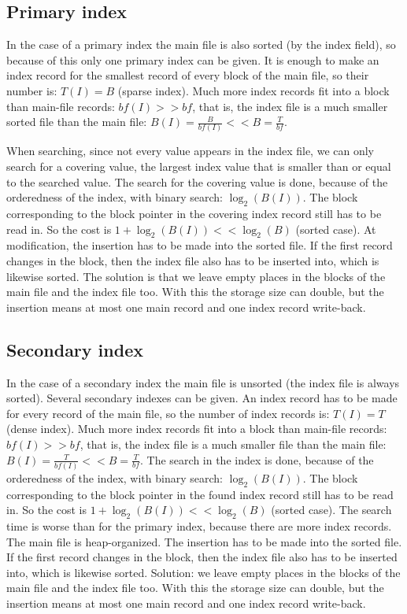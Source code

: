 \documentclass[margin=0px]{article}
\begin{document}
\subsection{Primary index}

In the case of a primary index the main file is also sorted (by the index field), so because of this only one primary
index can be given. It is enough to make an index record for the smallest record of every block of the main file,
so their number is: $T(I)  = B$ (sparse index). Much more index records fit into a block than
main-file records: $bf(I)  >> bf$, that is, the index file is a much smaller sorted file than the main file:
$B(I) = \frac{B}{bf(I)} << B = \frac{T}{bf}$.

When searching, since not every value appears in the index file, we can only search for a covering value, the
largest index value that is smaller than or equal to the searched value. The search for the covering value is done,
because of the orderedness of the index, with binary search: $\log_{2}(B(I))$. The block corresponding to the block pointer in
the covering index record still has to be read in. So the cost is $1+\log_{2}(B(I)) << \log_{2}(B)$ (sorted
case).
At modification, the insertion has to be made into the sorted file. If the first record changes in the block, then the
index file also has to be inserted into, which is likewise sorted. The solution is that we leave empty places in the
blocks of the main file and the index file too. With this the storage size can double, but the insertion means at most one
main record and one index record write-back.

\subsection{Secondary index}

In the case of a secondary index the main file is unsorted (the index file is always sorted). Several secondary indexes
can be given. An index record has to be made for every record of the main file, so the number of
index records is: $T(I) = T$ (dense index). Much more index records fit into a block than main-file
records: $bf(I) >> bf$, that is, the index file is a much smaller file than the main file: $B(I) = \frac{T}{bf(I)} <<
    B=\frac{T}{bf}$.
The search in the index is done, because of the orderedness of the index, with binary search: $\log_{2}(B(I))$. The block
corresponding to the block pointer in the found index record still has to be read in. So the cost is
$1+\log_{2}(B(I)) << \log_{2}(B)$ (sorted case). The search time is worse than for the primary index, because there are more
index records.
The main file is heap-organized. The insertion has to be made into the sorted file. If the first record changes in the block, then
the index file also has to be inserted into, which is likewise sorted. Solution: we leave empty places in the blocks of the main file and the
index file too. With this the storage size can double, but the insertion means at most one main record and one
index record write-back.
\end{document}
